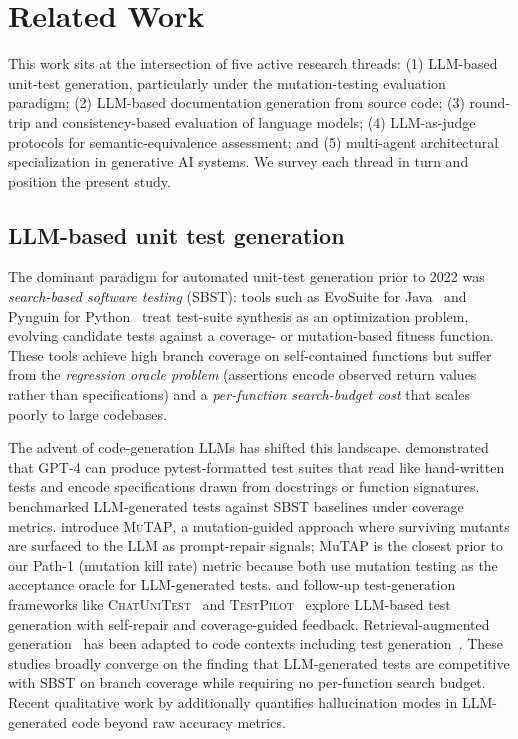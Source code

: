 \section{Related Work}
\label{sec:related_work}

This work sits at the intersection of five active research threads: (1) LLM-based unit-test generation, particularly under the mutation-testing evaluation paradigm; (2) LLM-based documentation generation from source code; (3) round-trip and consistency-based evaluation of language models; (4) LLM-as-judge protocols for semantic-equivalence assessment; and (5) multi-agent architectural specialization in generative AI systems. We survey each thread in turn and position the present study.

\subsection{LLM-based unit test generation}

The dominant paradigm for automated unit-test generation prior to 2022 was \emph{search-based software testing} (SBST): tools such as EvoSuite for Java~\citep{Fraser2011EvoSuite} and Pynguin for Python~\citep{Lukasczyk2022Pynguin} treat test-suite synthesis as an optimization problem, evolving candidate tests against a coverage- or mutation-based fitness function. These tools achieve high branch coverage on self-contained functions but suffer from the \emph{regression oracle problem} (assertions encode observed return values rather than specifications) and a \emph{per-function search-budget cost} that scales poorly to large codebases.

The advent of code-generation LLMs has shifted this landscape. \citet{Schafer2024TestPilot} demonstrated that GPT-4 can produce pytest-formatted test suites that read like hand-written tests and encode specifications drawn from docstrings or function signatures. \citet{Tufano2022LLMTest} benchmarked LLM-generated tests against SBST baselines under coverage metrics. \citet{Dakhel2024MuTAP} introduce \textsc{MuTAP}, a mutation-guided approach where surviving mutants are surfaced to the LLM as prompt-repair signals; MuTAP is the closest prior to our Path-1 (mutation kill rate) metric because both use mutation testing as the acceptance oracle for LLM-generated tests. \citet{Chen2023CodeT} and follow-up test-generation frameworks like \textsc{ChatUniTest}~\citep{Xie2024ChatUniTest} and \textsc{TestPilot}~\citep{Schafer2024TestPilot} explore LLM-based test generation with self-repair and coverage-guided feedback. Retrieval-augmented generation~\citep{Lewis2020RAG} has been adapted to code contexts including test generation~\citep{Zhang2023RAGCode}. These studies broadly converge on the finding that LLM-generated tests are competitive with SBST on branch coverage while requiring no per-function search budget. Recent qualitative work by \citet{Kang2025LLMHallucinationInCode} additionally quantifies hallucination modes in LLM-generated code beyond raw accuracy metrics.


